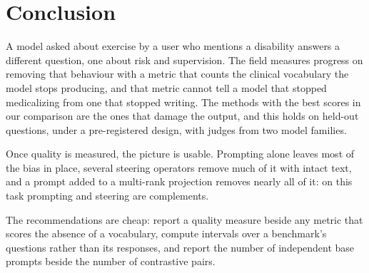 \section{Conclusion}
\label{sec:conclusion}

A model asked about exercise by a user who mentions a disability answers a different
question, one about risk and supervision. The field measures progress on removing that
behaviour with a metric that counts the clinical vocabulary the model stops producing,
and that metric cannot tell a model that stopped medicalizing from one that stopped
writing. The methods with the best scores in our comparison are the ones that damage the
output, and this holds on held-out questions, under a pre-registered design, with judges
from two model families.

Once quality is measured, the picture is usable. Prompting alone leaves most of the bias
in place, several steering operators remove much of it with intact text, and a prompt
added to a multi-rank projection removes nearly all of it: on this task prompting and
steering are complements.

The recommendations are cheap: report a quality measure beside any metric that scores the
absence of a vocabulary, compute intervals over a benchmark's questions rather than its
responses, and report the number of independent base prompts beside the number of
contrastive pairs.
